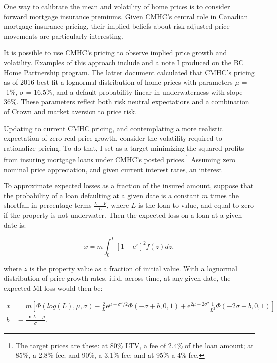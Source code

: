 \documentclass[12pt]{article}
\begin{document}
One way to calibrate the mean and volatility of home prices is to consider
forward mortgage insurance premiums. Given CMHC's central role in Canadian
mortgage insurance pricing, their implied beliefs about risk-adjusted price
movements are particularly interesting.

It is possible to use CMHC's pricing to observe implied price growth and
volatility. Examples of this approach include
\textcite{DowningStantonWallace} and a note I produced on the BC Home
Partnership program. The latter document calculated that CMHC's pricing as of
2016 best fit a lognormal distribution of home prices with parameters $\mu$ =
-1\%, $\sigma$ = 16.5\%, and a default probability linear in underwaterness
with slope 36\%. These parameters reflect both risk neutral expectations and a
combination of Crown and market aversion to price risk. 

Updating to current CMHC pricing, and contemplating a more realistic
expectation of zero real price growth, consider the volatility required to
rationalize pricing. To do that, I set as a target minimizing the squared
profits from insuring mortgage loans under CMHC's posted prices.\footnote{The
target prices are these: at 80\% LTV, a fee of 2.4\% of the loan amount; at
85\%, a 2.8\% fee; and 90\%, a 3.1\% fee; and at 95\% a 4\% fee.} Assuming zero
nominal price appreciation, and given current interest rates, an interest

To approximate expected losses as a fraction of the insured amount, suppose
that the probability of a loan defaulting at a given date is a constant $m$
times the shortfall in percentage terms $\frac{L-V}{L}$, where $L$ is the loan
to value, and equal to zero if the property is not underwater. Then the
expected loss on a loan at a given date is:

\begin{equation}
	\label{eq:loss_mi}
	x = m\int_{0}^{L}\left[1-\mathrm{e}^{z}\right]^{2}f(z)dz,
\end{equation}

where $z$ is the property value as a fraction of initial value. With a
lognormal distribution of price growth rates, i.i.d. across time, at any given
date, the expected MI loss would then be:

\begin{align}
	\label{eq:loss_mi}
	x & = m\left[\Phi\left(log(L),\mu,\sigma\right) - \frac{2}{L}\mathrm{e}^{\mu+\sigma^{2}/2}\Phi\left(-\sigma+b,0,1\right) + \mathrm{e}^{2\mu + 2\sigma^{2}}\frac{1}{L^{2}}\Phi(-2\sigma+b,0,1)\right]\\
	b & \equiv \frac{\ln L - \mu}{\sigma}.
\end{align}
\end{document}
